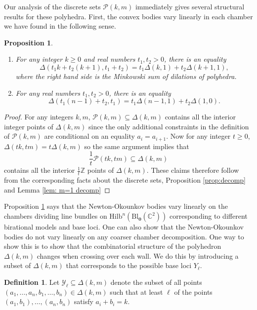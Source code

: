 \documentclass[12pt]{amsart}
\newcommand{\Hilb}{\mathrm{Hilb}}
\newcommand{\C}{\mathbb{C}}
\newcommand{\Z}{\mathbb{Z}}
\newcommand{\Bl}{\mathrm{Bl}}
\numberwithin{equation}{section}
\newtheorem{proposition}[theorem]{Proposition}
\theoremstyle{definition}
\newtheorem{definition}[theorem]{Definition}
\begin{document}
Our analysis of the discrete sets $\mathcal{P}(k,m)$ immediately gives several structural results for these polyhedra. First, the convex bodies vary linearly in each chamber we have found in the following sense.

\begin{proposition}\label{prop:NO body linearity}
    \begin{enumerate}
        \item For any integer $k\geq 0$ and real numbers $t_1,t_2>0$, there is an equality 
            \[ \Delta(t_1k+t_2(k+1),t_1+t_2) = t_1 \Delta(k,1)+ t_2 \Delta(k+1,1), \]
        where the right hand side is the Minkowski sum of dilations of polyhedra.
        \item For any real numbers $t_1,t_2>0$, there is an equality 
            \[ \Delta(t_1(n-1)+t_2,t_1) = t_1 \Delta(n-1,1)+t_2 \Delta(1,0). \]
    \end{enumerate}
\end{proposition}

\begin{proof}
    For any integers $k,m$, $\mathcal{P}(k,m)\subseteq \Delta(k,m)$ contains all the interior integer points of $\Delta(k,m)$ since the only additional constraints in the definition of $\mathcal{P}(k,m)$ are conditional on an equality $a_i=a_{i+1}$. Now for any integer $t\geq 0$, $\Delta(tk,tm) = t \Delta(k,m)$ so the same argument implies that 
    \[ \frac{1}{t}\mathcal{P}(tk,tm) \subseteq \Delta(k,m) \]
    contains all the interior $\frac{1}{t}\Z$ points of $\Delta(k,m).$ These claims therefore follow from the corresponding facts about the discrete sets, Proposition \ref{prop:decomp} and Lemma \ref{lem: m=1 decomp}
\end{proof}

Proposition \ref{prop:NO body linearity} says that the Newton-Okounkov bodies vary linearly on the chambers dividing line bundles on $\Hilb^n(\Bl_{\mathbf{0}}(\C^2))$ corresponding to different birational models and base loci. One can also show that the Newton-Okounkov bodies do not vary linearly on any coarser chamber decomposition. One way to show this is to show that the combinatorial structure of the polyhedron $\Delta(k,m)$ changes when crossing over each wall. We do this by introducing a subset of $\Delta(k,m)$ that corresponds to the possible base loci $Y_\ell$.

\begin{definition}
    Let $\mathcal{Y}_\ell \subseteq \Delta(k,m)$ denote the subset of all points $(a_1,\dots,a_n,b_1,\dots,b_n)\in\Delta(k,m)$ such that at least $\ell$ of the points $(a_1,b_1),\dots,(a_n,b_n)$ satisfy $a_i+b_i = k$.
\end{definition}
\end{document}
